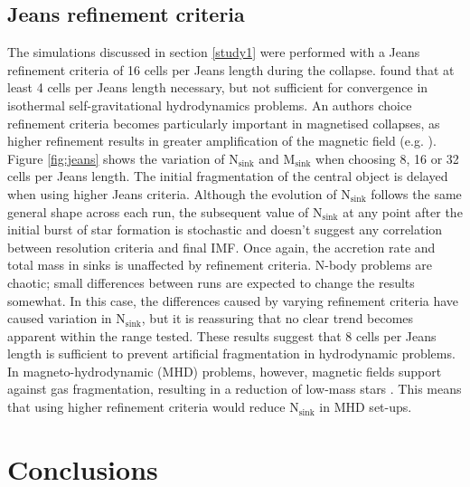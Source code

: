 \documentclass[fleqn,usenatbib]{mnras}
\begin{document}
\subsection{Jeans refinement criteria}
The simulations discussed in section \ref{study1} were performed with a Jeans refinement criteria of 16 cells per Jeans length during the collapse. \cite{Truelove1997} found that at least 4 cells per Jeans length necessary, but not  sufficient  for convergence in isothermal self-gravitational hydrodynamics problems. An authors choice refinement criteria becomes particularly important in magnetised collapses, as higher refinement results in greater amplification of the magnetic field (e.g. \citealt{Federrath2011,Turk2012}). Figure \ref{fig:jeans} shows the variation of N$_{\text{sink}}$ and M$_{\text{sink}}$ when choosing 8, 16 or 32 cells per Jeans length. The initial fragmentation of the central object is delayed when using higher Jeans criteria. Although the  evolution of N$_{\text{sink}}$ follows the same general shape across each run, the subsequent value of N$_{\text{sink}}$ at any point after the initial burst of star formation is stochastic and doesn't suggest any correlation between resolution criteria and final IMF. Once again, the accretion rate and total mass in sinks is unaffected by refinement criteria. N-body problems are chaotic; small differences between runs are expected to change the results somewhat. In this case, the differences caused by varying refinement criteria have caused variation in N$_{\text{sink}}$, but it is reassuring that no clear trend becomes apparent within the range tested. These results suggest that 8 cells per Jeans length is sufficient to prevent artificial fragmentation in hydrodynamic problems. In magneto-hydrodynamic (MHD) problems, however, magnetic fields support against gas fragmentation, resulting in a reduction of low-mass stars \citep{Sharda2020}. This means that using higher refinement criteria would reduce N$_{\text{sink}}$ in MHD set-ups.

\section{Conclusions}
\end{document}
